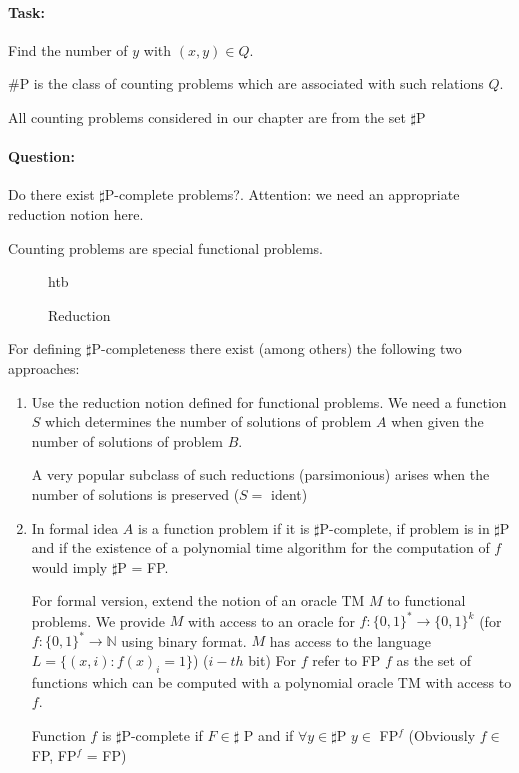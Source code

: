 \documentclass[11pt]{article}
\theoremstyle{definition}
\theoremstyle{definition}
\begin{document}
\paragraph{Task:} Find the number of $ y $ with $ (x, y) \in Q $.

\#P is the class of counting problems which are associated with such relations $ Q $.

All counting problems considered in our chapter are from the set $ \sharp $P

\paragraph{Question:} Do there exist $ \sharp $P-complete problems?. Attention: we need an appropriate reduction notion here.

Counting problems are special functional problems.

\begin{figure}{htb}
\caption{Reduction}
\end{figure}

For defining $ \sharp$P-completeness there exist (among others) the following two approaches:
\begin{enumerate}
\item Use the reduction notion defined for functional problems. We need a function $ S $ which determines the number of solutions of problem $ A $ when given the number of solutions of problem $ B $.

A very popular subclass of such reductions (parsimonious) arises when the number of solutions is preserved ($ S = $ ident)
\item In formal idea  $ A $ is a function problem if it is $ \sharp$P-complete, if problem is in $ \sharp $P and if the existence of a polynomial time algorithm for the computation of $ f $ would imply $ \sharp$P = FP.

For formal version, extend the notion of an oracle TM $ M $ to functional problems. We provide $ M $ with access to an oracle for $ f: \{0, 1 \}^\ast \rightarrow \{0, 1 \}^k $ (for $ f: \{0, 1 \}^\ast \rightarrow \mathbb{N} $ using binary format. $ M $ has access to the language $ L = \{(x, i): f(x)_i = 1 \}$) ($ i-th $ bit)
For $ f $ refer to FP $ f $ as the set of functions which can be computed with a polynomial oracle TM with access to $ f $.

Function $ f $ is $ \sharp $P-complete if $ F \in \sharp $ P and if $ \forall y \in \sharp $P $y \in$ FP$^f $ (Obviously $ f \in $ FP, FP$^f$ = FP)
\end{enumerate}
\end{document}
